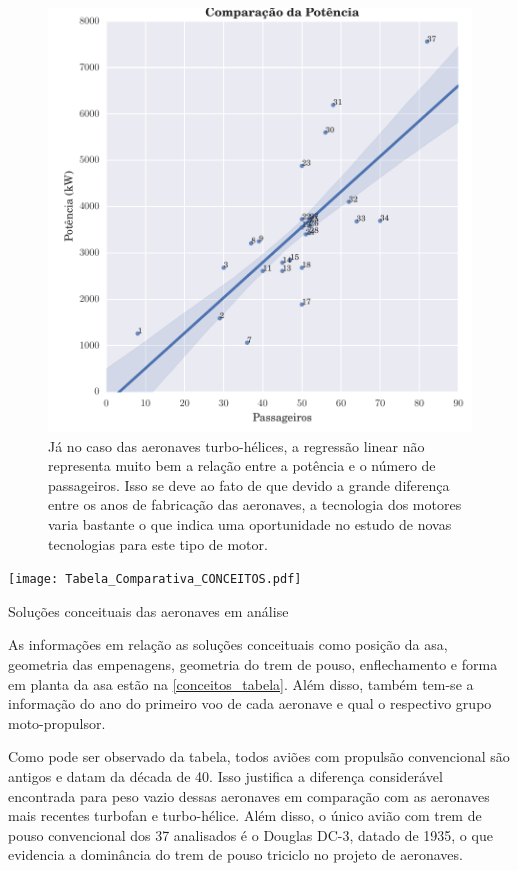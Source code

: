 \begin{figure}
\centering
\includegraphics{../autogenerated/graficos_comparativos/potencia.pdf}
\caption[Comparação da potência para aeronaves com turbo-hélice]{Já no caso das aeronaves turbo-hélices, a regressão linear não representa muito bem a relação entre a potência e o número de passageiros. Isso se deve ao fato de que devido a grande diferença entre os anos de fabricação das aeronaves, a tecnologia dos motores varia bastante o que indica uma oportunidade no estudo de novas tecnologias para este tipo de motor.}
\label{fig:potencia}
\end{figure}

\begin{table}
\texttt{[image: Tabela\_Comparativa\_CONCEITOS.pdf]}
\caption{Soluções conceituais das aeronaves em análise}
\label{conceitos_tabela}
\end{table}

\clearpage
As informações em relação as soluções conceituais como posição da asa, geometria das empenagens, geometria do trem de pouso, enflechamento e forma em planta da asa estão na \autoref{conceitos_tabela}. Além disso, também tem-se a informação do ano do primeiro voo de cada aeronave e qual o respectivo grupo moto-propulsor.

Como pode ser observado da tabela, todos aviões com propulsão convencional são antigos e datam da década de 40. Isso justifica a diferença considerável encontrada para peso vazio dessas aeronaves em comparação com as aeronaves mais recentes turbofan e turbo-hélice. Além disso, o único avião com trem de pouso convencional dos 37 analisados é o Douglas DC-3, datado de 1935, o que evidencia a dominância do trem de pouso triciclo no projeto de aeronaves.

